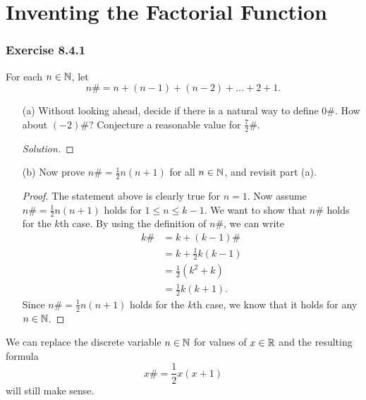 \section{Inventing the Factorial Function}


\subsubsection{Exercise 8.4.1} For each \( n \in \mathbb{N}  \), let 
\[  n \# = n + (n -1 ) + (n-2) + \dots + 2 + 1. \]
\begin{enumerate}
    \item[(a)] Without looking ahead, decide if there is a natural way to define \( 0 \#  \). How about \( (-2) \#  \)? Conjecture a reasonable value for \(  \frac{ 7 }{ 2 }  \# \).
        \begin{proof}[Solution]
        
        \end{proof}
    \item[(b)] Now prove \( n \# = \frac{ 1 }{ 2 }  n (n+1) \) for all \( n \in \mathbb{N}  \), and revisit part (a).
        \begin{proof}
        The statement above is clearly true for \( n =1  \). Now assume \(  n \#   = \frac{ 1 }{ 2 }  n (n+1) \) holds for \(  1 \leq n \leq k -1  \). We want to show that \( n \#  \) holds for the \( k  \)th case. By using the definition of \( n \#  \), we can write 
        \begin{align*}
            k \# &= k + (k-1)\#  \\
                 &= k + \frac{ 1 }{ 2 }  k (k-1) \\
                 &= \frac{ 1 }{ 2 }  (k^{2} + k) \\
                 &= \frac{ 1 }{ 2 } k (k+1).
        \end{align*}
        Since \( n \# = \frac{ 1 }{ 2 }  n (n+1)  \) holds for the \( k  \)th case, we know that it holds for any \( n \in \mathbb{N}  \).
        \end{proof}
\end{enumerate}
We can replace the discrete variable \( n \in \mathbb{N}   \) for values of \( x \in \mathbb{R}  \) and the resulting formula 
\[  x \# = \frac{ 1 }{ 2 }  x (x+1)  \] will still make sense.

